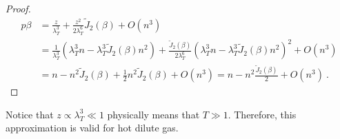 \begin{proof}
        \begin{equation*}
        \begin{aligned}
            p \beta & = \frac{z}{\lambda_T^3} + \frac{z^2}{2 \lambda_T^6} \tilde J_2 (\beta) + O(n^3) \\ & = \frac{1}{\lambda_T^3} (\lambda_T^3 n - \lambda^3_T \tilde J_2(\beta) n^2) + \frac{\tilde J_2 (\beta)}{2 \lambda_T^6} ( \lambda_T^3 n - \lambda^3_T \tilde J_2(\beta) n^2)^2 + O(n^3) \\ & = n - n^2 \tilde J_2 (\beta) + \frac{1}{2} n^2 \tilde J_2 (\beta) + O(n^3) = n - n^2 \frac{\tilde J_2(\beta)}{2} + O(n^3) ~.
        \end{aligned}
        \end{equation*}
    \end{proof}
    Notice that $z \propto \lambda^3_T \ll 1$ physically means that $T \gg 1$. Therefore, this approximation is valid for hot dilute gas.

